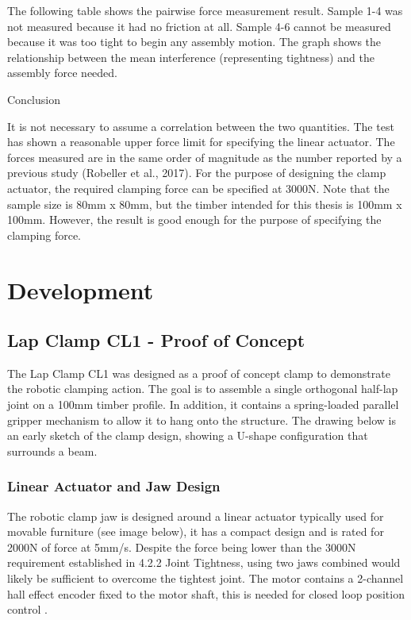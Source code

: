 The following table shows the pairwise force measurement result. Sample 1-4 was not measured because it had no friction at all. Sample 4-6 cannot be measured because it was too tight to begin any assembly motion. The graph shows the relationship between the mean interference (representing tightness) and the assembly force needed. 

Conclusion

It is not necessary to assume a correlation between the two quantities. The test has shown a reasonable upper force limit for specifying the linear actuator. The forces measured are in the same order of magnitude as the number reported by a previous study (Robeller et al., 2017). For the purpose of designing the clamp actuator, the required clamping force can be specified at 3000N. 
Note that the sample size is 80mm x 80mm, but the timber intended for this thesis is 100mm x 100mm. However, the result is good enough for the purpose of specifying the clamping force.

\section{Development}
\label{section:exploration_1_development}

\subsection{Lap Clamp CL1 - Proof of Concept}
\label{subsection:exploration_1_lap_clamp_cl1_proof_of_concept}

The Lap Clamp CL1 was designed as a proof of concept clamp to demonstrate the robotic clamping action. The goal is to assemble a single orthogonal half-lap joint on a 100mm timber profile. 
In addition, it contains a spring-loaded parallel gripper mechanism to allow it to hang onto the structure. The drawing below is an early sketch of the clamp design, showing a U-shape configuration that surrounds a beam.

\subsubsection{Linear Actuator and Jaw Design}
\label{subsubsection:exploration_1_linear_actuator_and_jaw_design}

The robotic clamp jaw is designed around a linear actuator typically used for movable furniture (see image below), it has a compact design and is rated for 2000N of force at 5mm/s. Despite the force being lower than the 3000N requirement established in 4.2.2 Joint Tightness, using two jaws combined would likely be sufficient to overcome the tightest joint. The motor contains a 2-channel hall effect encoder fixed to the motor shaft, this is needed for closed loop position control . 


